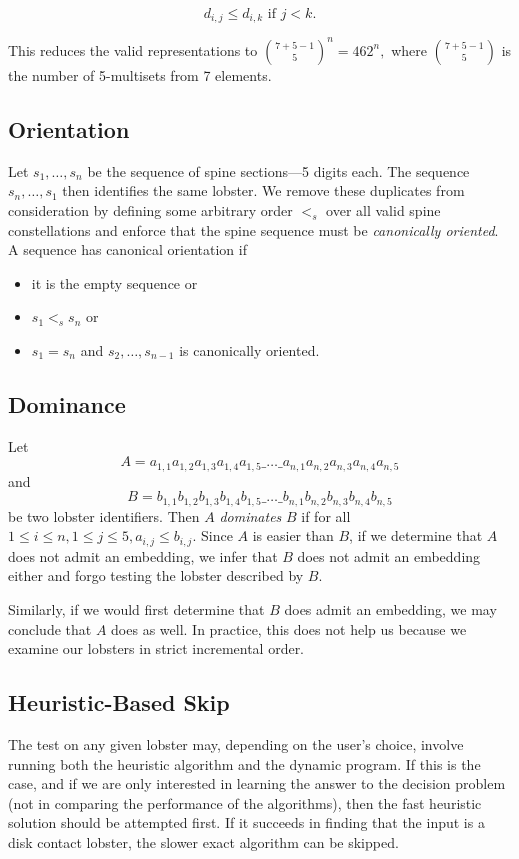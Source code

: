 $$d_{i,j} \leq d_{i,k} \text{ if } j < k.$$

This reduces the valid representations to $\binom{7 + 5 - 1}{5}^n = 462^n,$ where $\binom{7 + 5 - 1}{5}$ is the number of 5-multisets from 7 elements.

\subsection{Orientation}

Let $s_1,\ldots,s_n$ be the sequence of spine sections---5 digits each. The sequence $s_n,\ldots,s_1$ then identifies the same lobster. We remove these duplicates from consideration by defining some arbitrary order $<_s$ over all valid spine constellations and enforce that the spine sequence must be \emph{canonically oriented}. A sequence has canonical orientation if

\begin{itemize}
    \item it is the empty sequence or
    \item $s_1 <_s s_n$ or
    \item $s_1 = s_n$ and $s_2, \ldots, s_{n-1}$ is canonically oriented.
\end{itemize}

\subsection{Dominance}

Let $$A = a_{1,1}a_{1,2}a_{1,3}a_{1,4}a_{1,5}\_\ldots\_a_{n,1}a_{n,2}a_{n,3}a_{n,4}a_{n,5}$$ and $$B = b_{1,1}b_{1,2}b_{1,3}b_{1,4}b_{1,5}\_\ldots\_b_{n,1}b_{n,2}b_{n,3}b_{n,4}b_{n,5}$$ be two lobster identifiers. Then $A$ \emph{dominates} $B$ if for all $1 \leq i \leq n, 1 \leq j \leq 5, a_{i,j} \leq b_{i,j}$. Since $A$ is easier than $B$, if we determine that $A$ does not admit an embedding, we infer that $B$ does not admit an embedding either and forgo testing the lobster described by $B$.

Similarly, if we would first determine that $B$ does admit an embedding, we may conclude that $A$ does as well. In practice, this does not help us because we examine our lobsters in strict incremental order.

\subsection{Heuristic-Based Skip}

The test on any given lobster may, depending on the user's choice, involve running both the heuristic algorithm and the dynamic program. If this is the case, and if we are only interested in learning the answer to the decision problem (not in comparing the performance of the algorithms), then the fast heuristic solution should be attempted first. If it succeeds in finding that the input is a disk contact lobster, the slower exact algorithm can be skipped.

